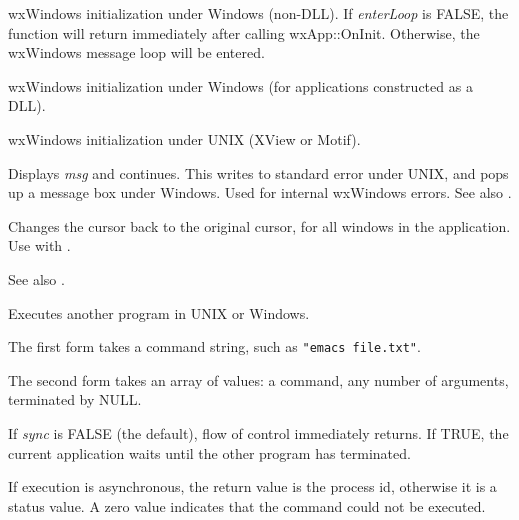 wxWindows initialization under Windows (non-DLL). If {\it enterLoop} is FALSE, the
function will return immediately after calling wxApp::OnInit. Otherwise, the wxWindows
message loop will be entered.

 
wxWindows initialization under Windows (for applications constructed as a DLL).


wxWindows initialization under UNIX (XView or Motif).

\label{wxerror}


Displays {\it msg} and continues. This writes to standard error under
UNIX, and pops up a message box under Windows. Used for internal
wxWindows errors. See also .

\label{wxendbusycursor}


Changes the cursor back to the original cursor, for all windows in the application.
Use with .

See also .

\label{wxexecute}



Executes another program in UNIX or Windows.

The first form takes a command string, such as {\tt "emacs file.txt"}.

The second form takes an array of values: a command, any number of
arguments, terminated by NULL.

If {\it sync} is FALSE (the default), flow of control immediately returns.
If TRUE, the current application waits until the other program has terminated.

If execution is asynchronous, the return value is the process id,
otherwise it is a status value.  A zero value indicates that the command could not
be executed.

